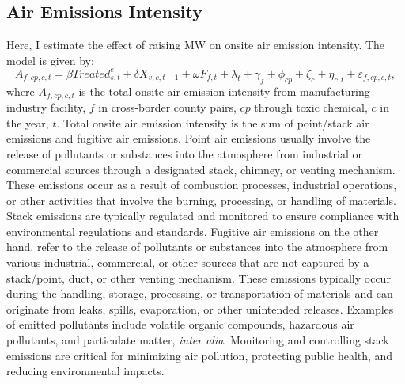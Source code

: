 \documentclass[12pt, english]{article}
\begin{document}
    \subsection{Air Emissions Intensity}\label{subsec:air-emission-intensity}
    Here, I estimate the effect of raising MW on onsite air emission intensity. The model is given by:
    \begin{equation}
        A_{f,cp,c,t} = \beta Treated_{s,t}^e + \delta X_{v,c,t-1} + \omega F_{f,t} + \lambda_{t} + \gamma_{f} + \phi_{cp} + \zeta_{c} + \eta_{c,t} + \varepsilon_{f,cp,c,t},\label{eq:baseline-onsite-air-emission-intensity}
    \end{equation}
    where $A_{f,cp,c,t}$ is the total onsite air emission intensity from manufacturing industry facility, $f$ in cross-border county pairs, $cp$ through toxic chemical, $c$ in the year, $t$. Total onsite air emission intensity is the sum of point/stack air emissions and fugitive air emissions. Point air emissions usually involve the release of pollutants or substances into the atmosphere from industrial or commercial sources through a designated stack, chimney, or venting mechanism. These emissions occur as a result of combustion processes, industrial operations, or other activities that involve the burning, processing, or handling of materials. Stack emissions are typically regulated and monitored to ensure compliance with environmental regulations and standards. Fugitive air emissions on the other hand, refer to the release of pollutants or substances into the atmosphere from various industrial, commercial, or other sources that are not captured by a stack/point, duct, or other venting mechanism. These emissions typically occur during the handling, storage, processing, or transportation of materials and can originate from leaks, spills, evaporation, or other unintended releases. Examples of emitted pollutants include volatile organic compounds, hazardous air pollutants, and particulate matter, \textit{inter alia}. Monitoring and controlling stack emissions are critical for minimizing air pollution, protecting public health, and reducing environmental impacts.
    
\end{document}

